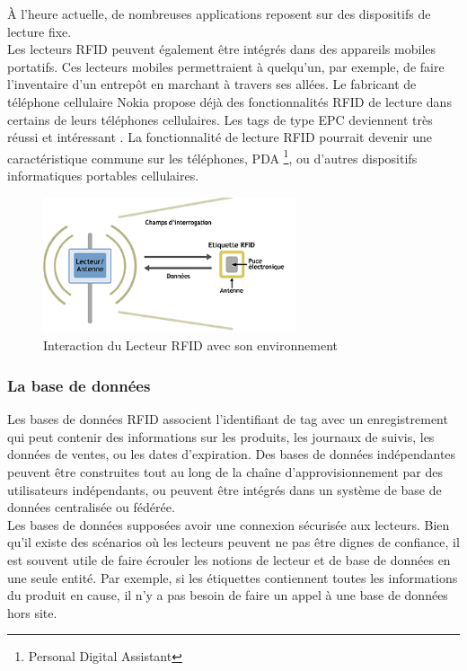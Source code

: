 \documentclass[11pt, a4paper, twoside]{book}
\begin{document}
À l'heure actuelle, de nombreuses applications reposent sur des dispositifs de lecture fixe.\\

Les lecteurs RFID peuvent également être intégrés dans des appareils mobiles portatifs. Ces lecteurs mobiles permettraient à quelqu'un, par exemple, de faire l'inventaire d'un entrepôt en marchant à travers ses allées. Le fabricant de téléphone cellulaire Nokia propose déjà des fonctionnalités RFID de lecture dans certains de leurs téléphones cellulaires. Les tags de type EPC deviennent très réussi et intéressant . La fonctionnalité de lecture RFID pourrait devenir une caractéristique commune sur les téléphones, PDA \footnote{Personal Digital Assistant}, ou d'autres dispositifs informatiques portables cellulaires.
\begin{figure}[H]
\centering
\includegraphics[height=4cm]{reader}
\caption{Interaction du Lecteur RFID avec son environnement}
\end{figure}
\subsubsection{La base de données}
Les bases de données RFID associent l'identifiant de tag avec un enregistrement qui peut contenir des informations sur les produits, les journaux de suivis, les données de ventes, ou les dates d'expiration. Des bases de données indépendantes peuvent être construites tout au long de la chaîne d'approvisionnement par des utilisateurs indépendants, ou peuvent être intégrés dans un système de base de données centralisée ou fédérée.\\

Les bases de données supposées avoir une connexion sécurisée aux lecteurs. Bien qu'il existe des scénarios où les lecteurs peuvent ne pas être dignes de confiance, il est souvent utile de faire écrouler les notions de lecteur et de base de données en une seule entité. Par exemple, si les étiquettes contiennent toutes les informations du produit en cause, il n'y a pas besoin de faire un appel à une base de données hors site.\\
\end{document}
